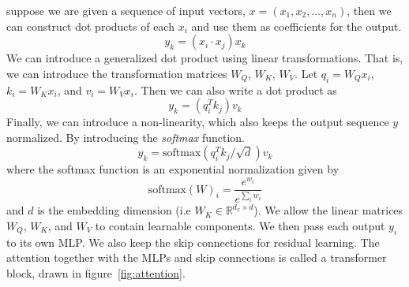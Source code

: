 suppose we are given a sequence of input vectors, $x=(x_1,x_2,\ldots,x_n)$, then we can construct dot products of each $x_i$ and use them as coefficients for the output.
\begin{equation}
	y_k = (x_i \cdot x_j)x_k
\end{equation}
We can introduce a generalized dot product using linear transformations. That is, we can introduce the transformation matrices $W_Q$, $W_K$, $W_V$. Let $q_i = W_Q x_i$, $k_i = W_K x_i$, and $v_i = W_V x_i$. Then we can also write a dot product as 
\begin{equation}
	y_k = (q_i^T k_j)v_k
\end{equation}
Finally, we can introduce a non-linearity, which also keeps the output sequence $y$ normalized. By introducing the \textit{softmax} function.
\begin{equation}
	y_k = \mathrm{softmax}(q_i^T k_j / \sqrt{d})v_k
\end{equation}
where the softmax function is an exponential normalization given by
\begin{equation}
	\mathrm{softmax}(W)_i = \frac{e^{w_i}}{e^{\sum_i{w_i}}}
\end{equation}
and $d$ is the embedding dimension (i.e $W_K\in \mathbb{R}^{d_x\times d}$).
We allow the linear matrices $W_Q$, $W_K$, and $W_V$ to contain learnable components. We then pass each output $y_i$ to its own MLP. We also keep the skip connections for residual learning. The attention together with the MLPs and skip connections is called a transformer block, drawn in figure~\ref{fig:attention}.
